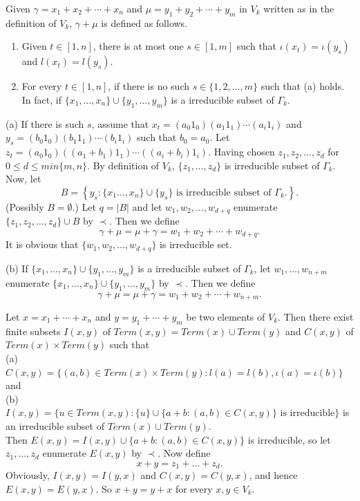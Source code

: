 \documentclass[10pt,a4paper]{amsart}
\begin{document}
\begin{definition}{\label{3.366}}
	Given \( \gamma = x_1 + x_2 + \cdots + x_n \) and \( \mu = y_1 + y_2 + \cdots + y_m \) in \( V_k \) written as in the definition of \( V_k \), \( \gamma + \mu \) is defined as follows.
	\begin{enumerate}
		
		\item[(a)] 	Given \( t \in [1,n] \), there is at most one \( s \in [1,m] \) such that \( \iota(x_t) = \iota(y_s) \) and \( l(x_t) = l(y_s) \). 
		
		\item[(b)] For every \( t \in [1,n] \), if there is no such \( s \in \{1, 2, \ldots, m\} \) such that (a) holds. In fact, if  $\{x_1,\ldots,x_n\}\cup\{y_1,\ldots,y_m\}$ is a irreducible subset of $\Gamma_k$.
	\end{enumerate}
	(a) If there is such \( s \), assume that $x_t = (a_0 1_0)(a_1 1_1) \cdots (a_i 1_i)$ and $ y_s = (b_0 1_0)(b_1 1_1) \cdots (b_i 1_i)$ such that \( b_0 = a_0 \). Let $z_t = (a_0 1_0)((a_1 + b_1) 1_1) \cdots ((a_i + b_i) 1_i)$. Having chosen \( z_1, z_2, \ldots, z_d \) for $0\leq d\leq min\{m,n\}$. By definition of $V_k$, $\{z_1,\ldots,z_d\}$ is irreducible subset of $\Gamma_k$. Now, let
	\[
	B = \left\{ y_s :\{x_1\ldots,x_n\}\cup\{y_s\}\text{ is irreducible subset of }\Gamma_k. \right\}.
	\]
	(Possibly \( B = \emptyset \).) 	Let \( q = |B| \) and let \( w_1, w_2, \ldots, w_{d+q} \) enumerate \linebreak \( \{z_1, z_2, \ldots, z_d\} \cup B \) by $\prec$. Then we define
	\[
	\gamma + \mu = \mu + \gamma = w_1 + w_2 + \cdots + w_{d+q}.
	\]
	It is obvious that $\{w_1,w_2,\ldots,w_{d+q}\}$ is irreducible set.
	
	(b) If $\{x_1,\ldots,x_n\}\cup\{y_1,\ldots,y_m\}$ is a irreducible subset of $\Gamma_k$, let $w_1,\ldots,w_{n+m}$ enumerate $\{x_1,\ldots,x_n\}\cup\{y_1,\ldots,y_m\}$ by $\prec$. Then we define 
	\[
	\gamma+\mu=\mu+\gamma=w_1+w_2+\cdots+w_{n+m}.
	\]
\end{definition}

\begin{remark}{\label{3.44}}
	Let $x=x_1+\cdots+x_n$ and $y=y_1+\cdots+y_m$ be two elements of $V_k$. Then there exist finite subsets $I(x,y)$ of $Term(x,y)=Term(x)\cup Term(y)$ and $C(x,y)$ of $Term(x)\times Term(y)$ such that\\
	(a) $C(x,y)=\{(a,b)\in Term(x)\times Term(y):l(a)=l(b),\iota(a)=\iota(b)\}$ and \\
	(b) $I(x,y)=\{u\in Term(x,y): \{u\}\cup\{a+b:(a,b)\in C(x,y)\}\mbox{ is irreducible}\}$ is an irreducible subset of $Term(x)\cup Term(y)$. \\
	Then $E(x,y)=I(x,y)\cup \{a+b:(a,b)\in C(x,y)\}$ is irreducible, so let $z_1,\ldots,z_d$ enumerate $E(x,y)$ by $\prec$. Now define 
	\[
	x+y=z_1+\ldots+z_d.
	\]  
	Obviously, $I(x,y)=I(y,x)$ and $C(x,y)=C(y,x)$, and hence $E(x,y)=E(y,x)$. So $x+y=y+x$ for every $x,y\in V_k$.
\end{remark}
\end{document}
